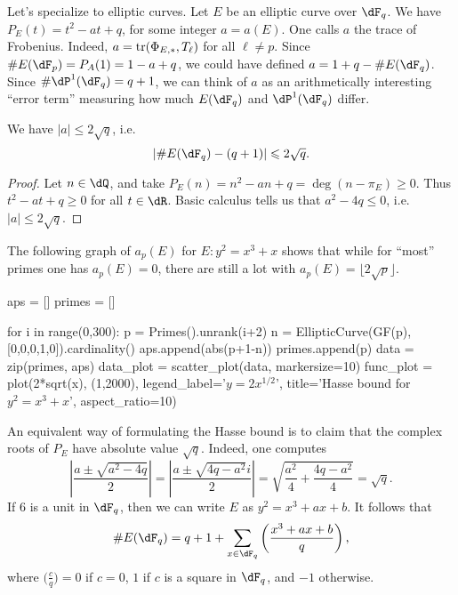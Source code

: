 Let's specialize to elliptic curves. Let $E$ be an elliptic curve over 
$\dF_q$. We have $P_E(t)=t^2-a t+q$, for some integer $a=a(E)$. One calls $a$ 
the trace of Frobenius. Indeed, $a=\operatorname{tr}(\Phi_{E,\ast},T_\ell)$ for 
all $\ell\ne p$. Since $\# E(\dF_p)=P_A(1)=1-a+q$, we could have defined 
$a=1+q-\# E(\dF_q)$. Since $\# \dP^1(\dF_q)=q+1$, we can think of $a$ as an 
arithmetically interesting ``error term'' measuring how much $E(\dF_q)$ and 
$\dP^1(\dF_q)$ differ. 

\begin{theorem}
We have $|a| \leqslant 2\sqrt q$, i.e. 
\[
  | \# E(\dF_q) - (q+1)| \leqslant 2\sqrt q \text{.}
\]
\end{theorem}
\begin{proof}
Let $n\in\dQ$, and take $P_E(n)=n^2-a n+q = \deg(n-\pi_E)\geqslant 0$. Thus 
$t^2-a t+q\geqslant 0$ for all $t\in \dR$. Basic calculus tells us that 
$a^2-4 q\leqslant 0$, i.e. $|a|\leqslant 2\sqrt q$. 
\end{proof}


The following graph of $a_p(E)$ for $E:y^2=x^3+x$ shows that while for 
``most'' primes one has $a_p(E)=0$, there are still a lot with 
$a_p(E)=\lfloor 2\sqrt p\rfloor$. 

\begin{sagesilent}
  aps = []
  primes = []

  for i in range(0,300):
      p = Primes().unrank(i+2)
      n = EllipticCurve(GF(p),[0,0,0,1,0]).cardinality()
      aps.append(abs(p+1-n))
      primes.append(p)
  data = zip(primes, aps)
  data_plot = scatter_plot(data, markersize=10)
  func_plot = plot(2*sqrt(x), (1,2000), legend_label='$y=2x^{1/2}$', title='Hasse bound for $y^2=x^3+x$', aspect_ratio=10)
\end{sagesilent}

\begin{center}
\end{center}


An equivalent way of formulating the Hasse bound is to claim that the complex 
roots of $P_E$ have absolute value $\sqrt q$. Indeed, one computes 
\[
  \left|\frac{a\pm \sqrt{a^2-4 q}}{2}\right| 
    = \left|\frac{a\pm \sqrt{4 q-a^2} i}{2}\right| 
    = \sqrt{\frac{a^2}{4} + \frac{4 q-a^2}{4}}
    = \sqrt q \text{.}
\]
If $6$ is a unit in $\dF_q$, then we can write $E$ as $y^2=x^3+a x+b$. It 
follows that 
\[
  \# E(\dF_q) = q+1 + \sum_{x\in \dF_q} \left(\frac{x^3+a x+b}{q}\right) \text{,}
\]
where $\big(\frac{c}{q}\big)=0$ if $c=0$, $1$ if $c$ is a square in $\dF_q$, 
and $-1$ otherwise. 

